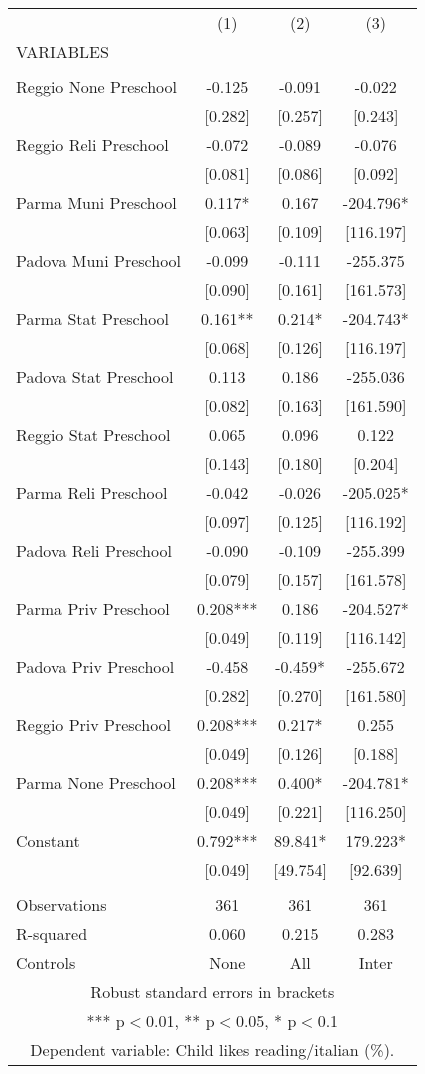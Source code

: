 \begin{tabular}{lccc} \hline
 & (1) & (2) & (3) \\
VARIABLES &  &  &  \\ \hline
 &  &  &  \\
Reggio None Preschool & -0.125 & -0.091 & -0.022 \\
 & [0.282] & [0.257] & [0.243] \\
Reggio Reli Preschool & -0.072 & -0.089 & -0.076 \\
 & [0.081] & [0.086] & [0.092] \\
Parma Muni Preschool & 0.117* & 0.167 & -204.796* \\
 & [0.063] & [0.109] & [116.197] \\
Padova Muni Preschool & -0.099 & -0.111 & -255.375 \\
 & [0.090] & [0.161] & [161.573] \\
Parma Stat Preschool & 0.161** & 0.214* & -204.743* \\
 & [0.068] & [0.126] & [116.197] \\
Padova Stat Preschool & 0.113 & 0.186 & -255.036 \\
 & [0.082] & [0.163] & [161.590] \\
Reggio Stat Preschool & 0.065 & 0.096 & 0.122 \\
 & [0.143] & [0.180] & [0.204] \\
Parma Reli Preschool & -0.042 & -0.026 & -205.025* \\
 & [0.097] & [0.125] & [116.192] \\
Padova Reli Preschool & -0.090 & -0.109 & -255.399 \\
 & [0.079] & [0.157] & [161.578] \\
Parma Priv Preschool & 0.208*** & 0.186 & -204.527* \\
 & [0.049] & [0.119] & [116.142] \\
Padova Priv Preschool & -0.458 & -0.459* & -255.672 \\
 & [0.282] & [0.270] & [161.580] \\
Reggio Priv Preschool & 0.208*** & 0.217* & 0.255 \\
 & [0.049] & [0.126] & [0.188] \\
Parma None Preschool & 0.208*** & 0.400* & -204.781* \\
 & [0.049] & [0.221] & [116.250] \\
Constant & 0.792*** & 89.841* & 179.223* \\
 & [0.049] & [49.754] & [92.639] \\
 &  &  &  \\
Observations & 361 & 361 & 361 \\
R-squared & 0.060 & 0.215 & 0.283 \\
 Controls & None & All & Inter \\ \hline
\multicolumn{4}{c}{ Robust standard errors in brackets} \\
\multicolumn{4}{c}{ *** p$<$0.01, ** p$<$0.05, * p$<$0.1} \\
\multicolumn{4}{c}{ Dependent variable: Child likes reading/italian (\%).} \\
\end{tabular}
